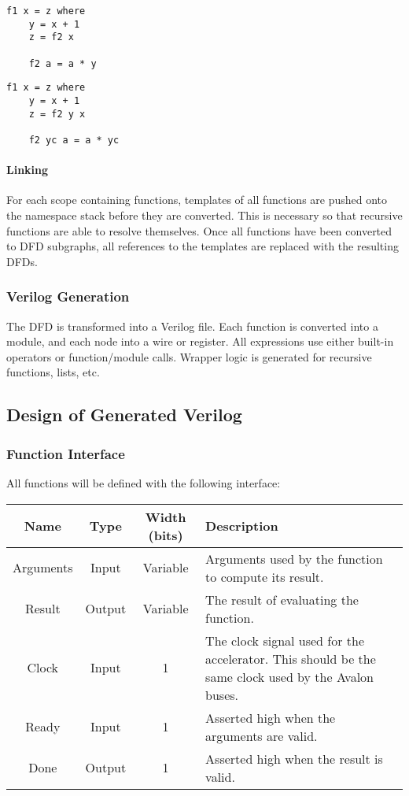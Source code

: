 \documentclass[english,onecolumn]{article}
\begin{document}
\begin{lstlisting}[caption={A nested function with a closure.}, label=lst:closure]
f1 x = z where
    y = x + 1
    z = f2 x

    f2 a = a * y
\end{lstlisting}

\begin{lstlisting}[caption={The function from Listing \ref{lst:closure}, rewritten to use arguments.}]
f1 x = z where
    y = x + 1
    z = f2 y x

    f2 yc a = a * yc
\end{lstlisting}

\paragraph{Linking}
For each scope containing functions, templates of all functions are pushed onto the namespace stack before they are converted. This is necessary so that recursive functions are able to resolve themselves. Once all functions have been converted to DFD subgraphs, all references to the templates are replaced with the resulting DFDs.

\subsubsection{Verilog Generation}
The DFD is transformed into a Verilog file. Each function is converted into a module, and each node into a wire or register. All expressions use either built-in operators or function/module calls. Wrapper logic is generated for recursive functions, lists, etc.

\subsection{Design of Generated Verilog}


\subsubsection{Function Interface}
\label{s:functionInterface}
All functions will be defined with the following interface:

\begin{tabularx}{\textwidth}{|c|c|c|X|}
\hline 
Name & Type & Width (bits) & Description \\ \hline 
Arguments & Input & Variable & Arguments used by the function to compute its result. \\ \hline 
Result & Output & Variable & The result of evaluating the function. \\ \hline 
Clock & Input & 1 & The clock signal used for the accelerator. This should be the same clock used by the Avalon buses. \\ \hline 
Ready & Input & 1 & Asserted high when the arguments are valid. \\ \hline 
Done & Output & 1 & Asserted high when the result is valid. \\ \hline
\end{tabularx} 
\end{document}
